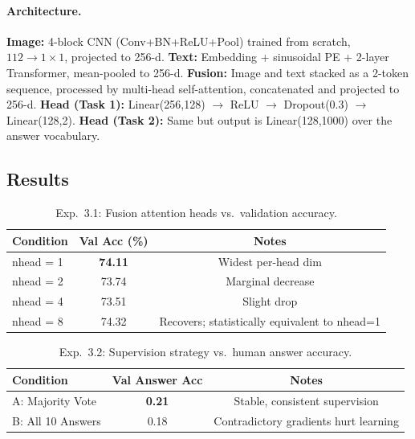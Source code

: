 \documentclass[11pt]{article}
\begin{document}
\paragraph{Architecture.}
\textbf{Image:} 4-block CNN (Conv+BN+ReLU+Pool) trained from scratch, $112\to1\times1$,
projected to 256-d. \textbf{Text:} Embedding + sinusoidal PE + 2-layer Transformer,
mean-pooled to 256-d. \textbf{Fusion:} Image and text stacked as a 2-token sequence,
processed by multi-head self-attention, concatenated and projected to 256-d.
\textbf{Head (Task 1):} Linear(256,128) $\to$ ReLU $\to$ Dropout(0.3) $\to$ Linear(128,2).
\textbf{Head (Task 2):} Same but output is Linear(128,1000) over the answer vocabulary.

\subsection{Results}

\begin{table}[h]
  \centering
  \caption{Exp.\ 3.1: Fusion attention heads vs.\ validation accuracy.}
  \label{tab:exp31_cls}
  \begin{tabular}{lcc}
    \toprule
    \textbf{Condition} & \textbf{Val Acc (\%)} & \textbf{Notes} \\
    \midrule
    nhead = 1 & \textbf{74.11} & Widest per-head dim \\
    nhead = 2 & 73.74 & Marginal decrease \\
    nhead = 4 & 73.51 & Slight drop \\
    nhead = 8 & 74.32 & Recovers; statistically equivalent to nhead=1 \\
    \bottomrule
  \end{tabular}
\end{table}

\begin{table}[h]
  \centering
  \caption{Exp.\ 3.2: Supervision strategy vs.\ human answer accuracy.}
  \label{tab:exp32_gen}
  \begin{tabular}{lcc}
    \toprule
    \textbf{Condition} & \textbf{Val Answer Acc} & \textbf{Notes} \\
    \midrule
    A: Majority Vote  & \textbf{0.21} & Stable, consistent supervision \\
    B: All 10 Answers & 0.18          & Contradictory gradients hurt learning \\
    \bottomrule
  \end{tabular}
\end{table}
\end{document}
